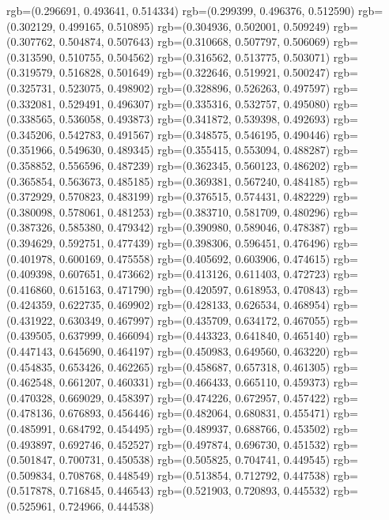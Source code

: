 {{{					rgb=(0.296691, 0.493641, 0.514334)
					rgb=(0.299399, 0.496376, 0.512590)
					rgb=(0.302129, 0.499165, 0.510895)
					rgb=(0.304936, 0.502001, 0.509249)
					rgb=(0.307762, 0.504874, 0.507643)
					rgb=(0.310668, 0.507797, 0.506069)
					rgb=(0.313590, 0.510755, 0.504562)
					rgb=(0.316562, 0.513775, 0.503071)
					rgb=(0.319579, 0.516828, 0.501649)
					rgb=(0.322646, 0.519921, 0.500247)
					rgb=(0.325731, 0.523075, 0.498902)
					rgb=(0.328896, 0.526263, 0.497597)
					rgb=(0.332081, 0.529491, 0.496307)
					rgb=(0.335316, 0.532757, 0.495080)
					rgb=(0.338565, 0.536058, 0.493873)
					rgb=(0.341872, 0.539398, 0.492693)
					rgb=(0.345206, 0.542783, 0.491567)
					rgb=(0.348575, 0.546195, 0.490446)
					rgb=(0.351966, 0.549630, 0.489345)
					rgb=(0.355415, 0.553094, 0.488287)
					rgb=(0.358852, 0.556596, 0.487239)
					rgb=(0.362345, 0.560123, 0.486202)
					rgb=(0.365854, 0.563673, 0.485185)
					rgb=(0.369381, 0.567240, 0.484185)
					rgb=(0.372929, 0.570823, 0.483199)
					rgb=(0.376515, 0.574431, 0.482229)
					rgb=(0.380098, 0.578061, 0.481253)
					rgb=(0.383710, 0.581709, 0.480296)
					rgb=(0.387326, 0.585380, 0.479342)
					rgb=(0.390980, 0.589046, 0.478387)
					rgb=(0.394629, 0.592751, 0.477439)
					rgb=(0.398306, 0.596451, 0.476496)
					rgb=(0.401978, 0.600169, 0.475558)
					rgb=(0.405692, 0.603906, 0.474615)
					rgb=(0.409398, 0.607651, 0.473662)
					rgb=(0.413126, 0.611403, 0.472723)
					rgb=(0.416860, 0.615163, 0.471790)
					rgb=(0.420597, 0.618953, 0.470843)
					rgb=(0.424359, 0.622735, 0.469902)
					rgb=(0.428133, 0.626534, 0.468954)
					rgb=(0.431922, 0.630349, 0.467997)
					rgb=(0.435709, 0.634172, 0.467055)
					rgb=(0.439505, 0.637999, 0.466094)
					rgb=(0.443323, 0.641840, 0.465140)
					rgb=(0.447143, 0.645690, 0.464197)
					rgb=(0.450983, 0.649560, 0.463220)
					rgb=(0.454835, 0.653426, 0.462265)
					rgb=(0.458687, 0.657318, 0.461305)
					rgb=(0.462548, 0.661207, 0.460331)
					rgb=(0.466433, 0.665110, 0.459373)
					rgb=(0.470328, 0.669029, 0.458397)
					rgb=(0.474226, 0.672957, 0.457422)
					rgb=(0.478136, 0.676893, 0.456446)
					rgb=(0.482064, 0.680831, 0.455471)
					rgb=(0.485991, 0.684792, 0.454495)
					rgb=(0.489937, 0.688766, 0.453502)
					rgb=(0.493897, 0.692746, 0.452527)
					rgb=(0.497874, 0.696730, 0.451532)
					rgb=(0.501847, 0.700731, 0.450538)
					rgb=(0.505825, 0.704741, 0.449545)
					rgb=(0.509834, 0.708768, 0.448549)
					rgb=(0.513854, 0.712792, 0.447538)
					rgb=(0.517878, 0.716845, 0.446543)
					rgb=(0.521903, 0.720893, 0.445532)
					rgb=(0.525961, 0.724966, 0.444538)
}}}
